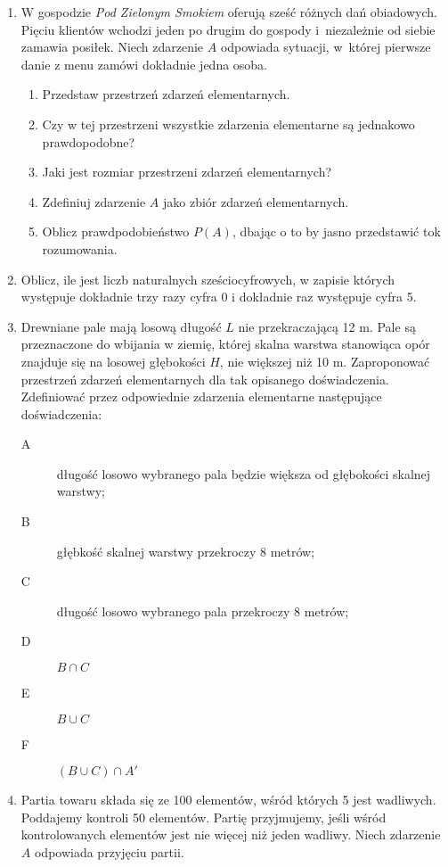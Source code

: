 \documentclass[twoside]{mwart}
\newcommand{\ans}[1]{}
\newcommand{\ans}[1]{\par\emph{Odpowiedź:} #1}
\begin{document}
\begin{enumerate}
\item W gospodzie \emph{Pod Zielonym Smokiem} oferują sześć różnych dań obiadowych. Pięciu klientów wchodzi jeden po drugim do gospody
i~niezależnie od siebie zamawia posiłek. Niech zdarzenie $A$ odpowiada sytuacji, w~której pierwsze danie z menu zamówi dokładnie jedna osoba.%
\begin{enumerate}%
\item Przedstaw przestrzeń zdarzeń elementarnych. \ans{$\Omega=\{\omega_{i_1,\ldots,i_5}|i_j=1,2,\ldots,6\}$}%
\item Czy w tej przestrzeni wszystkie zdarzenia elementarne są jednakowo prawdopodobne? \ans{Tak}%
\item Jaki jest rozmiar przestrzeni zdarzeń elementarnych? \ans{$\left|\Omega\right|=6^5$}%
\item Zdefiniuj zdarzenie $A$ jako zbiór zdarzeń elementarnych. \ans{$A=\{\omega_{i_1,\ldots,i_5}|\exists j: i_j=1 \land \forall k\neq j: i_k\neq 1\}$, $\left|A\right|=5\cdot5^4$}%
\item Oblicz prawdpodobieństwo $P(A)$, dbając o to by jasno przedstawić tok rozumowania. \ans{$P(A)=\frac{5^5}{6^5}=\frac{5}{6}^5\approx 0{,}40$}%
\end{enumerate}%
\item Oblicz, ile jest liczb naturalnych sześciocyfrowych, w zapisie których występuje dokładnie trzy razy cyfra 0 i dokładnie raz występuje cyfra 5. \ans{${8\choose 2}3\frac{5!}{3!}+8\cdot\left(\frac{5!}{3!2!}+\frac{5!}{3!}\right)=1920$}
\item  Drewniane pale mają losową długość $L$ nie przekraczającą 12 m. Pale są przeznaczone do wbijania w ziemię, której skalna warstwa stanowiąca opór znajduje się na losowej głębokości $H$, nie większej niż 10 m. Zaproponować przestrzeń zdarzeń elementarnych dla tak opisanego doświadczenia. Zdefiniować przez odpowiednie zdarzenia elementarne następujące doświadczenia:
\begin{description}
\item[A] długość losowo wybranego pala będzie większa od głębokości skalnej warstwy;
\item[B] głębkość skalnej warstwy przekroczy 8 metrów;
\item[C] długość losowo wybranego pala przekroczy 8 metrów;
\item[D] $B\cap C$
\item[E] $B\cup C$
\item[F] $(B\cup C)\cap A'$
\end{description}
\item Partia towaru składa się ze 100 elementów, wśród których 5 jest wadliwych. Poddajemy kontroli 50 elementów. Partię przyjmujemy, jeśli wśród kontrolowanych elementów jest nie więcej niż jeden wadliwy. Niech zdarzenie $A$ odpowiada przyjęciu partii.

\end{enumerate}
\end{document}
